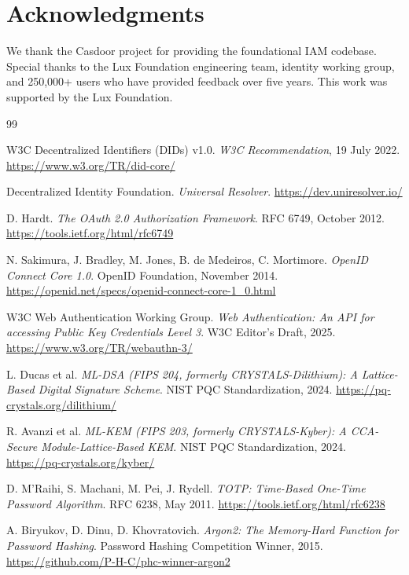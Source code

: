 \section*{Acknowledgments}


We thank the Casdoor project for providing the foundational IAM codebase. Special thanks to the Lux Foundation engineering team, identity working group, and 250,000+ users who have provided feedback over five years. This work was supported by the Lux Foundation.

\begin{thebibliography}{99}

W3C Decentralized Identifiers (DIDs) v1.0.
\textit{W3C Recommendation}, 19 July 2022.
\url{https://www.w3.org/TR/did-core/}

Decentralized Identity Foundation.
\textit{Universal Resolver}.
\url{https://dev.uniresolver.io/}

D. Hardt.
\textit{The OAuth 2.0 Authorization Framework}.
RFC 6749, October 2012.
\url{https://tools.ietf.org/html/rfc6749}

N. Sakimura, J. Bradley, M. Jones, B. de Medeiros, C. Mortimore.
\textit{OpenID Connect Core 1.0}.
OpenID Foundation, November 2014.
\url{https://openid.net/specs/openid-connect-core-1_0.html}

W3C Web Authentication Working Group.
\textit{Web Authentication: An API for accessing Public Key Credentials Level 3}.
W3C Editor's Draft, 2025.
\url{https://www.w3.org/TR/webauthn-3/}

L. Ducas et al.
\textit{ML-DSA (FIPS 204, formerly CRYSTALS-Dilithium): A Lattice-Based Digital Signature Scheme}.
NIST PQC Standardization, 2024.
\url{https://pq-crystals.org/dilithium/}

R. Avanzi et al.
\textit{ML-KEM (FIPS 203, formerly CRYSTALS-Kyber): A CCA-Secure Module-Lattice-Based KEM}.
NIST PQC Standardization, 2024.
\url{https://pq-crystals.org/kyber/}

D. M'Raihi, S. Machani, M. Pei, J. Rydell.
\textit{TOTP: Time-Based One-Time Password Algorithm}.
RFC 6238, May 2011.
\url{https://tools.ietf.org/html/rfc6238}

A. Biryukov, D. Dinu, D. Khovratovich.
\textit{Argon2: The Memory-Hard Function for Password Hashing}.
Password Hashing Competition Winner, 2015.
\url{https://github.com/P-H-C/phc-winner-argon2}


\end{thebibliography}
